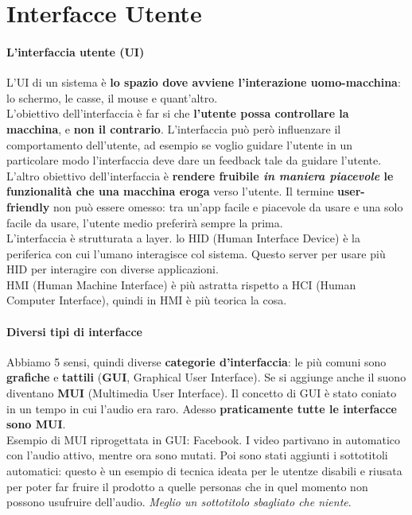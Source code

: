 \documentclass[10pt]{article}
\begin{document}
\section{Interfacce Utente}
\paragraph{L'interfaccia utente (UI)} L'UI di un sistema è \textbf{lo spazio dove avviene l'interazione uomo-macchina}: lo schermo, le casse, il mouse e quant'altro.\\
L'obiettivo dell'interfaccia è far si che \textbf{l'utente possa controllare la macchina}, e \textbf{non il contrario}. L'interfaccia può però influenzare il comportamento dell'utente, ad esempio se voglio guidare l'utente in un particolare modo l'interfaccia deve dare un feedback tale da guidare l'utente.\\
L'altro obiettivo dell'interfaccia è \textbf{rendere fruibile \textit{in maniera piacevole} le funzionalità che una macchina eroga} verso l'utente. Il termine \textbf{user-friendly} non può essere omesso: tra un'app facile e piacevole da usare e una solo facile da usare, l'utente medio preferirà sempre la prima.\\
L'interfaccia è strutturata a layer. lo HID (Human Interface Device) è la periferica con cui l'umano interagisce col sistema. Questo server per usare più HID per interagire con diverse applicazioni.\\
HMI (Human Machine Interface) è più astratta rispetto a HCI (Human Computer Interface), quindi in HMI è più teorica la cosa.
\paragraph{Diversi tipi di interfacce} Abbiamo 5 sensi, quindi diverse \textbf{categorie d'interfaccia}: le più comuni sono \textbf{grafiche} e \textbf{tattili} (\textbf{GUI}, Graphical User Interface). Se si aggiunge anche il suono diventano \textbf{MUI} (Multimedia User Interface). Il concetto di GUI è stato coniato in un tempo in cui l'audio era raro. Adesso \textbf{praticamente tutte le interfacce sono MUI}.\\
Esempio di MUI riprogettata in GUI: Facebook. I video partivano in automatico con l'audio attivo, mentre ora sono mutati. Poi sono stati aggiunti i sottotitoli automatici: questo è un esempio di tecnica ideata per le utentze disabili e riusata per poter far fruire il prodotto a quelle personas che in quel momento non possono usufruire dell'audio. \textit{Meglio un sottotitolo sbagliato che niente}.
\end{document}
